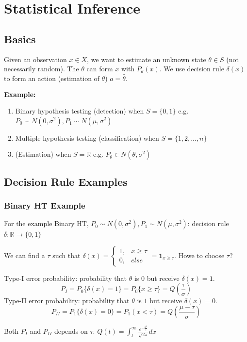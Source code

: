 \documentclass[11pt,a4paper]{article}
\begin{document}
\section{Statistical Inference}

\subsection{Basics}
Given an observation $x\in X$, we want to estimate an unknown state $\theta \in S$ (not necessarily random). The $\theta$ can form $x$ with $P_\theta(x)$. We use decision rule $\delta (x)$ to form an action (estimation of $\theta$) $a=\hat{\theta}$.

\textbf{Example:}
\begin{enumerate}[(1)]
    \item Binary hypothesis testing (detection) when $S=\{0,1\}$ e.g. $P_0\sim N(0,\sigma^2), P_1\sim N(\mu,\sigma^2)$
    \item Multiple hypothesis testing (classification) when $S=\{1,2,...,n\}$
    \item (Estimation) when $S=\mathbb{R}$ e.g. $P_\theta\in N(\theta,\sigma^2)$
\end{enumerate}

\subsection{Decision Rule Examples}
\subsubsection*{Binary HT Example}
For the example Binary HT, $P_0\sim N(0,\sigma^2), P_1\sim N(\mu,\sigma^2)$: decision rule $\delta: \mathbb{R} \rightarrow \{0,1\}$

We can find a $\tau$ such that $\delta(x)=\left\{\begin{matrix}
    1,&x\ge \tau\\
    0,& else
\end{matrix}\right.=\mathbf{1}_{x\geq \tau}$. Howe to choose $\tau$?

Type-I error probability: probability that $\theta$ is $0$ but receive $\delta(x)=1$. $$P_I=P_0\{\delta(x)=1\}=P_0\{x\geq \tau\}=Q\left(\frac{\tau}{\sigma}\right)$$
Type-II error probability: probability that $\theta$ is $1$ but receive $\delta(x)=0$. $$P_{II}=P_1\{\delta(x)=0\}=P_1(x<\tau)=Q(\frac{\mu-\tau}{\sigma})$$

Both $P_I$ and $P_{II}$ depends on $\tau$. $Q(t)=\int_t^\infty\frac{e^{-\frac{x^2}{2}}}{\sqrt{2\pi}}dx$
\end{document}
